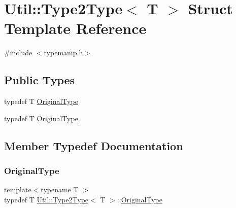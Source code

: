 \hypertarget{structUtil_1_1Type2Type}{}\section{Util\+:\+:Type2\+Type$<$ T $>$ Struct Template Reference}
\label{structUtil_1_1Type2Type}


{\ttfamily \#include $<$typemanip.\+h$>$}

\subsection*{Public Types}
\begin{DoxyCompactItemize}
\item 
typedef T \mbox{\hyperlink{structUtil_1_1Type2Type_a053c4160c945f1588beb737bb6e952d1}{Original\+Type}}
\item 
typedef T \mbox{\hyperlink{structUtil_1_1Type2Type_a053c4160c945f1588beb737bb6e952d1}{Original\+Type}}
\end{DoxyCompactItemize}


\subsection{Member Typedef Documentation}
\mbox{\label{structUtil_1_1Type2Type_a053c4160c945f1588beb737bb6e952d1}} 
\subsubsection{\texorpdfstring{OriginalType}{OriginalType}\hspace{0.1cm}{\footnotesize\ttfamily [1/2]}}
{\footnotesize\ttfamily template$<$typename T $>$ \\
typedef T \mbox{\hyperlink{structUtil_1_1Type2Type}{Util\+::\+Type2\+Type}}$<$ T $>$\+::\mbox{\hyperlink{structUtil_1_1Type2Type_a053c4160c945f1588beb737bb6e952d1}{Original\+Type}}}

\mbox{\label{structUtil_1_1Type2Type_a053c4160c945f1588beb737bb6e952d1}} 
